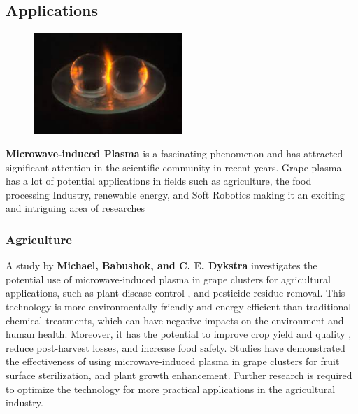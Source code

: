 \documentclass{article}
\begin{document}
\subsection{\Large Applications}
\begin{figure}[h]
        \centering
        \includegraphics[width=0.5\textwidth ]{download (4).jpg}
     \label{fig:download (4)}
    \end{figure}
\large
\textbf{Microwave-induced Plasma} is a fascinating phenomenon and has attracted significant attention in the scientific community in recent years. 
Grape plasma has a lot of potential applications in fields such as agriculture, the food processing Industry, renewable energy, and Soft Robotics making it an exciting and intriguing area of researches 

\subsubsection{\Large Agriculture}

\large A study by \textbf{Michael, Babushok, and C. E. Dykstra} investigates the potential use of microwave-induced plasma in grape clusters for agricultural applications, such as plant disease control \cite{GDS}, \cite{PGTD} and pesticide residue removal. 
This technology is more environmentally friendly and energy-efficient than traditional chemical treatments, which can have negative impacts on the environment and human health. Moreover, it has the potential to improve crop yield and quality \cite{MIP}, reduce post-harvest losses, and increase food safety. 
Studies have demonstrated the effectiveness of using microwave-induced plasma in grape clusters for fruit surface sterilization\cite{SSGB}, and plant growth enhancement. Further research is required to optimize the technology for more practical applications in the agricultural industry.
\end{document}
